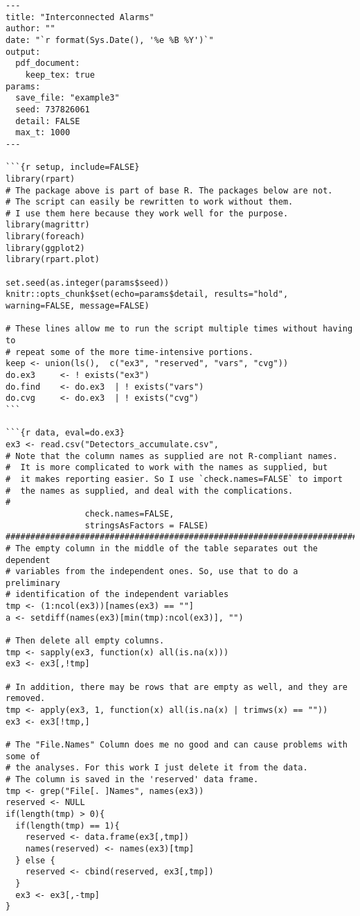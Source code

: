 \begin{lstlisting}[basicstyle=\scriptsize]
---
title: "Interconnected Alarms"
author: ""
date: "`r format(Sys.Date(), '%e %B %Y')`"
output:
  pdf_document:
    keep_tex: true
params:
  save_file: "example3"
  seed: 737826061
  detail: FALSE
  max_t: 1000
---

```{r setup, include=FALSE}
library(rpart)
# The package above is part of base R. The packages below are not.
# The script can easily be rewritten to work without them.
# I use them here because they work well for the purpose.
library(magrittr)
library(foreach)
library(ggplot2)
library(rpart.plot)

set.seed(as.integer(params$seed))
knitr::opts_chunk$set(echo=params$detail, results="hold", warning=FALSE, message=FALSE)

# These lines allow me to run the script multiple times without having to
# repeat some of the more time-intensive portions.
keep <- union(ls(),  c("ex3", "reserved", "vars", "cvg"))
do.ex3     <- ! exists("ex3")
do.find    <- do.ex3  | ! exists("vars")
do.cvg     <- do.ex3  | ! exists("cvg")
```

```{r data, eval=do.ex3}
ex3 <- read.csv("Detectors_accumulate.csv",
# Note that the column names as supplied are not R-compliant names.
#  It is more complicated to work with the names as supplied, but
#  it makes reporting easier. So I use `check.names=FALSE` to import
#  the names as supplied, and deal with the complications.
#
                check.names=FALSE,
                stringsAsFactors = FALSE)
#######################################################################
# The empty column in the middle of the table separates out the dependent
# variables from the independent ones. So, use that to do a preliminary
# identification of the independent variables
tmp <- (1:ncol(ex3))[names(ex3) == ""]
a <- setdiff(names(ex3)[min(tmp):ncol(ex3)], "")

# Then delete all empty columns.
tmp <- sapply(ex3, function(x) all(is.na(x)))
ex3 <- ex3[,!tmp]

# In addition, there may be rows that are empty as well, and they are removed.
tmp <- apply(ex3, 1, function(x) all(is.na(x) | trimws(x) == ""))
ex3 <- ex3[!tmp,]

# The "File.Names" Column does me no good and can cause problems with some of
# the analyses. For this work I just delete it from the data.
# The column is saved in the 'reserved' data frame.
tmp <- grep("File[. ]Names", names(ex3))
reserved <- NULL
if(length(tmp) > 0){
  if(length(tmp) == 1){
    reserved <- data.frame(ex3[,tmp])
    names(reserved) <- names(ex3)[tmp]
  } else {
    reserved <- cbind(reserved, ex3[,tmp])
  }
  ex3 <- ex3[,-tmp]
}


\end{lstlisting}
